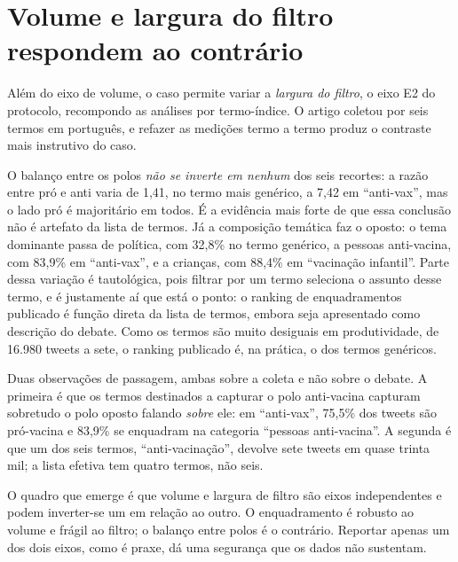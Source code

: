 \section{Volume e largura do filtro respondem ao contrário}

Além do eixo de volume, o caso permite variar a \emph{largura do filtro}, o eixo E2
do protocolo, recompondo as análises por termo-índice. O artigo coletou por seis
termos em português, e refazer as medições termo a termo produz o contraste mais
instrutivo do caso.

O balanço entre os polos \emph{não se inverte em nenhum} dos seis recortes: a razão
entre pró e anti varia de 1,41, no termo mais genérico, a 7,42 em ``anti-vax'', mas
o lado pró é majoritário em todos. É a evidência mais forte de que essa conclusão
não é artefato da lista de termos. Já a composição temática faz o oposto: o tema
dominante passa de política, com 32,8\% no termo genérico, a pessoas anti-vacina,
com 83,9\% em ``anti-vax'', e a crianças, com 88,4\% em ``vacinação infantil''.
Parte dessa variação é tautológica, pois filtrar por um termo seleciona o assunto
desse termo, e é justamente aí que está o ponto: o ranking de enquadramentos
publicado é função direta da lista de termos, embora seja apresentado como descrição
do debate. Como os termos são muito desiguais em produtividade, de 16.980 tweets a
sete, o ranking publicado é, na prática, o dos termos genéricos.

Duas observações de passagem, ambas sobre a coleta e não sobre o debate. A primeira
é que os termos destinados a capturar o polo anti-vacina capturam sobretudo o polo
oposto falando \emph{sobre} ele: em ``anti-vax'', 75,5\% dos tweets são pró-vacina e
83,9\% se enquadram na categoria ``pessoas anti-vacina''. A segunda é que um dos seis
termos, ``anti-vacinação'', devolve sete tweets em quase trinta mil; a lista efetiva
tem quatro termos, não seis.

O quadro que emerge é que volume e largura de filtro são eixos independentes e
podem inverter-se um em relação ao outro. O enquadramento é robusto ao volume e
frágil ao filtro; o balanço entre polos é o contrário. Reportar apenas um dos dois
eixos, como é praxe, dá uma segurança que os dados não sustentam.

